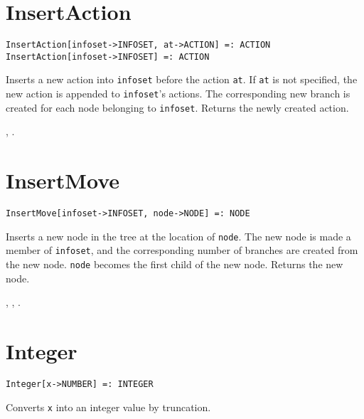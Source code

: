 
\section*{InsertAction}\label{PrimInsertAction}
\begin{verbatim}
InsertAction[infoset->INFOSET, at->ACTION] =: ACTION 
InsertAction[infoset->INFOSET] =: ACTION 
\end{verbatim}

\noindent
Inserts a new action into \verb+infoset+ before the action \verb+at+.
If \verb+at+ is not specified, the new action is appended to
\verb+infoset+'s actions.  The corresponding new branch is created for
each node belonging to \verb+infoset+.  Returns the newly created
action.

\seealso {},
.


\section*{InsertMove}\label{PrimInsertMove}
\begin{verbatim}
InsertMove[infoset->INFOSET, node->NODE] =: NODE 
\end{verbatim}

\noindent
Inserts a new node in the tree at the location of \verb+node+.  The
new node is made a member of \verb+infoset+, and the
corresponding number of branches are created from the new node.  \verb+node+
becomes the first child of the new node.  Returns the new node.

\seealso {},
,
.


\section*{Integer}\label{PrimInteger}
\begin{verbatim}
Integer[x->NUMBER] =: INTEGER 
\end{verbatim}

\noindent
Converts \verb+x+ into an integer value by truncation.


